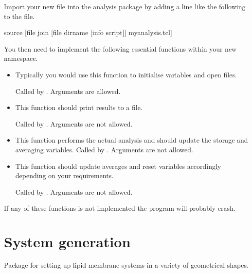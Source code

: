 Import your new file into the analysis package by adding a line like the following to the  file.

\begin{code}
    source [file join [file dirname [info script]] myanalysis.tcl]
\end{code}

You then need to implement the following essential functions within your new namespace.
\begin{itemize}
    \item {} 

      Typically you would use this function to initialise variables and open files. 

      Called by . Arguments are allowed.
    \item {} 

      This function should print results to a file. 

      Called by . Arguments are not allowed.
    \item {} 

      This function performs the actual analysis and should update the storage and averaging variables. 
      Called by . Arguments are not allowed.
    \item {} 

      This function should update averages and reset variables accordingly depending on your requirements. 

      Called by . Arguments are not allowed.
\end{itemize}
If any of these functions is not implemented the program will probably crash. 


\section{System generation}\label{mbtools::systemg}

Package for setting up lipid membrane systems in a variety of geometrical shapes.


